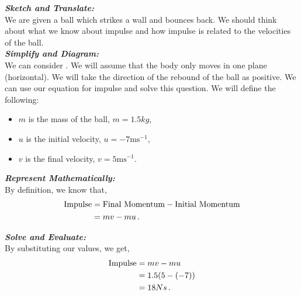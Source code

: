 \begin{subquestions}
\subquestion

\textbf{\textit{Sketch and Translate:}} \\
We are given a ball which strikes a wall and bounces back. We should think about what we know about impulse and how impulse is related to the velocities of the ball.\\




\textbf{\textit{Simplify and Diagram:}} \\
We can consider . We will assume that the body only moves in one plane (horizontal). We will take the direction of the rebound of the ball as positive. We can use our equation for impulse and solve this question.
We will define the following:
\begin{itemize}
	\item $m$ is the mass of the ball, $m=1.5kg$,
	\item $u$ is the initial velocity, $u=-7\text{ms}^{-1}$,
	\item $v$ is the final velocity, $v=5\text{ms}^{-1}$.
\end{itemize}




\textbf{\textit{Represent Mathematically:}} \\
By definition, we know that,
\begin{align}
	\text{Impulse} & = \text{Final Momentum} - \text{Initial Momentum} \nonumber \\ 
	               & = mv - mu \,.
\end{align}




\textbf{\textit{Solve and Evaluate:}} \\
By substituting our values, we get,
\begin{align}
	\text{Impulse} & = mv-mu \nonumber \\
	               & = 1.5(5-(-7)) \nonumber \\
	               & = 18Ns \,.
\end{align}


\subquestion


\end{subquestions}
